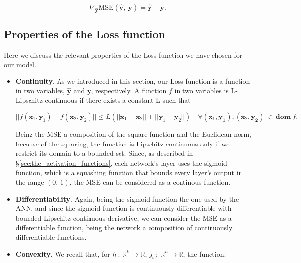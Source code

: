		\begin{equation*}
		     \nabla_{\hat{\mathbf{y}}}\text{MSE}\left(\hat{\mathbf{y}},\ \mathbf{y}\right) =
		     \hat{\mathbf{y}} - \mathbf{y}.
		\end{equation*}

        \subsection{Properties of the Loss function} %
        \label{sub:properties_of_the_loss_function}
            Here we discuss the relevant properties of the Loss function we have chosen for our model.

            \begin{itemize}
                \item \textbf{Continuity}. As we introduced in this section, our Loss function is a function in
                two variables, $\hat{\mathbf{y}}$ and $\mathbf{y}$, respectively. A function $f$ in two variables
                is L-Lipschitz continuous if there exists a constant L such that

                \begin{equation*}
                    || f(\mathbf{x}_1, \mathbf{y}_1) - f(\mathbf{x}_2, \mathbf{y}_2) || \le L(|| \mathbf{x}_1 -
                    \mathbf{x}_2|| + || \mathbf{y}_1 - \mathbf{y}_2||) \quad \forall (\mathbf{x}_1, \mathbf{y_1}),
                    (\mathbf{x}_2, \mathbf{y_2}) \ \in \ \mathbf{dom} \ f.
                \end{equation*}

                Being the MSE a composition of the square function and the Euclidean norm, because of the squaring,
                the function is Lipschitz continuous only if we restrict its domain to a bounded set. Since, as
                described in \S \ref{sec:the_activation_functions}, each network's layer uses the sigmoid
                function, which is a squashing function that bounds every layer's output in the range
                $\left ( 0,\ 1 \right )$, the MSE can be considered as a continous function.
                \item \textbf{Differentiability}. Again, being the sigmoid function the one used by the ANN,
                and since the sigmoid function is continuously differentiable with bounded Lipschitz continuous
                derivative, we can consider the MSE as a differentiable function, being the network a
                composition of continuously differentiable functions.
                \item \textbf{Convexity}. We recall that, for $h \ : \ \mathbb{R}^k \to \mathbb{R}$, $g_i \ : \
                \mathbb{R}^n \to \mathbb{R}$, the function:


\end{itemize}
